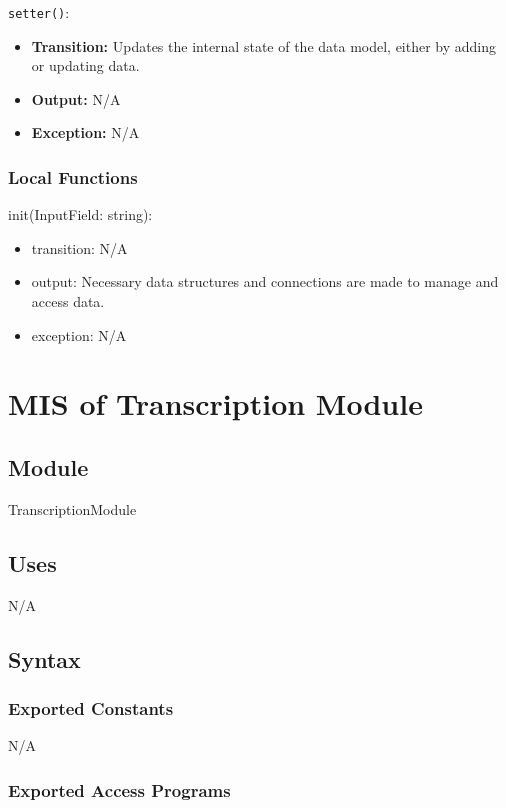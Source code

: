 \documentclass[12pt, titlepage]{article}
\begin{document}
\noindent \texttt{setter()}:
\begin{itemize}
    \item \textbf{Transition:} Updates the internal state of the data model, either by adding or updating data.
    \item \textbf{Output:} N/A
    \item \textbf{Exception:} N/A
\end{itemize}

\subsubsection{Local Functions}

\noindent init(InputField: string):
\begin{itemize}
\item transition: N/A
\item output: Necessary data structures and connections are made to manage and access data.
\item exception: N/A
\end{itemize}

\newpage

  
\section{MIS of Transcription Module} \label{Transcription_Module}

\subsection{Module}
TranscriptionModule

\subsection{Uses}

N/A

\subsection{Syntax}

\subsubsection{Exported Constants}

N/A

\subsubsection{Exported Access Programs}
\end{document}
